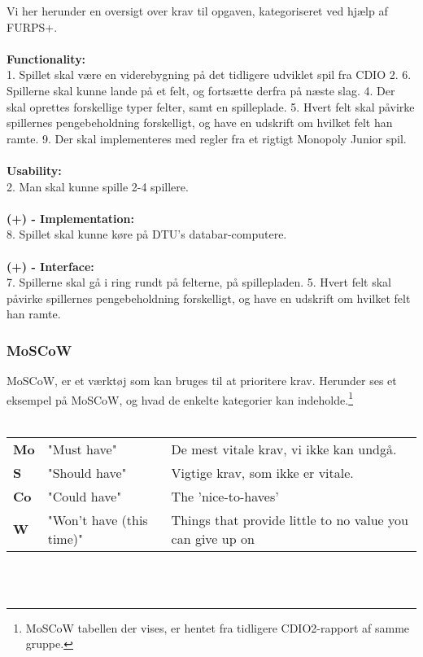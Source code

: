 \noindent Vi her herunder en oversigt over krav til opgaven, kategoriseret ved hjælp af FURPS+.
\\\\\textbf{Functionality:}\\
1. Spillet skal være en viderebygning på det tidligere udviklet spil fra CDIO 2.
6. Spillerne skal kunne lande på et felt, og fortsætte derfra på næste slag.
4. Der skal oprettes forskellige typer felter, samt en spilleplade.
5. Hvert felt skal påvirke spillernes pengebeholdning forskelligt, og have en udskrift om hvilket felt han ramte.
9. Der skal implementeres med regler fra et rigtigt Monopoly Junior spil.
\\\\\textbf{Usability:}\\
2. Man skal kunne spille 2-4 spillere.
\\\\\textbf{(+) - Implementation:}\\
8. Spillet skal kunne køre på DTU's databar-computere.
\\\\\textbf{(+) - Interface:}\\
7. Spillerne skal gå i ring rundt på felterne, på spillepladen.
5. Hvert felt skal påvirke spillernes pengebeholdning forskelligt, og have en udskrift om hvilket felt han ramte.

\pagebreak

\subsubsection{MoSCoW}

MoSCoW, er et værktøj som kan bruges til at prioritere krav.
Herunder ses et eksempel på MoSCoW, og hvad de enkelte kategorier kan indeholde.\footnote{MoSCoW tabellen der vises, er hentet fra tidligere CDIO2-rapport af samme gruppe.} \\\\

\begin{tabular}{lll}
    \textbf{Mo} &   
    "Must have"                 &
    De mest vitale krav, vi ikke kan undgå. \\

    \textbf{S}  &   
    "Should have"               & 
    Vigtige krav, som ikke er vitale. \\

    \textbf{Co} &   
    "Could have"                & 
    The 'nice-to-haves' \\

    \textbf{W}  &   
    "Won’t have (this time)"    & 
    Things that provide little to no value you can give up on \\

\end{tabular}
\\\\

